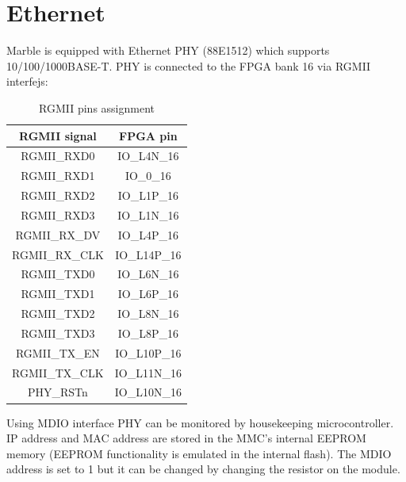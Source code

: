 \documentclass[12pt,oneside,a4]{article}
\begin{document}
\section{Ethernet}
Marble is equipped with Ethernet PHY (88E1512) which supports 10/100/1000BASE-T. PHY is connected to the FPGA bank 16 via RGMII interfejs:

\begin{table}[htbp]
\centering
\begin{tabular}{@{}cc@{}}
\toprule
\textbf{RGMII signal}              & \textbf{FPGA pin}                \\ \midrule
RGMII\_RXD0                        & IO\_L4N\_16                      \\
RGMII\_RXD1                        & IO\_0\_16                        \\
RGMII\_RXD2                        & IO\_L1P\_16                      \\
RGMII\_RXD3                        & IO\_L1N\_16                      \\
RGMII\_RX\_DV                      & IO\_L4P\_16                      \\
RGMII\_RX\_CLK                     & IO\_L14P\_16                     \\
RGMII\_TXD0                        & IO\_L6N\_16                      \\
RGMII\_TXD1                        & IO\_L6P\_16                      \\
RGMII\_TXD2                        & IO\_L8N\_16                      \\
RGMII\_TXD3                        & IO\_L8P\_16                      \\
RGMII\_TX\_EN                      & IO\_L10P\_16                     \\
\multicolumn{1}{l}{RGMII\_TX\_CLK} & \multicolumn{1}{l}{IO\_L11N\_16} \\
PHY\_RSTn                          & IO\_L10N\_16                     \\ \bottomrule
\end{tabular}
\caption{RGMII pins assignment}
\label{tab:rgmii}
\end{table}
Using MDIO interface PHY can be monitored by housekeeping microcontroller. IP address and MAC address are stored in the MMC's internal EEPROM memory (EEPROM functionality is emulated in the internal flash). 
The MDIO address is set to 1 but it can be changed by changing the resistor on the module. 
\end{document}
